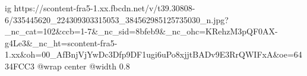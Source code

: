  
 
 
 
 

\ifcmt
  ig https://scontent-fra5-1.xx.fbcdn.net/v/t39.30808-6/335445620_224309303315053_384562985125735030_n.jpg?_nc_cat=102&ccb=1-7&_nc_sid=8bfeb9&_nc_ohc=KRehzM3pQF0AX-g4Le3&_nc_ht=scontent-fra5-1.xx&oh=00_AfBnjVjYwDc3Dfp9DF1ugi6uPo8xjjtBADv9E3RrQWIFxA&oe=6434FCC3
  @wrap center
  @width 0.8
\fi
